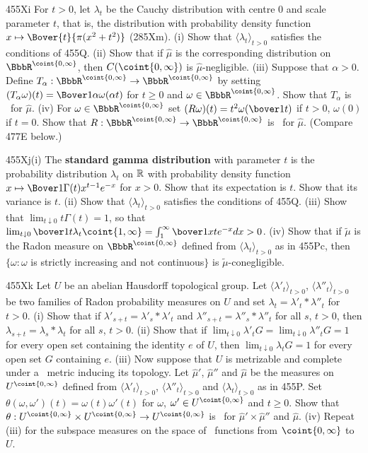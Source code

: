{\sqheader 455Xi For $t>0$, let $\lambda_t$ be the Cauchy
distribution with centre $0$ and scale parameter $t$, that is, the
distribution with probability density function
$x\mapsto\Bover{t}{\pi(x^2+t^2)}$ (285Xm).
(i) Show that $\langle\lambda_t\rangle_{t>0}$ satisfies the conditions of
455Q.   (ii) Show that if $\hat\mu$ is the corresponding distribution on
$\BbbR^{\coint{0,\infty}}$, then $C(\coint{0,\infty})$ is
$\hat\mu$-negligible.
(iii) Suppose that $\alpha>0$.   Define
$T_{\alpha}:\BbbR^{\coint{0,\infty}}\to\BbbR^{\coint{0,\infty}}$ by setting
$(T_{\alpha}\omega)(t)=\Bover1{\alpha}\omega(\alpha t)$ for $t\ge 0$ and
$\omega\in\BbbR^{\coint{0,\infty}}$.   Show that $T_{\alpha}$ is \imp\ for
$\hat\mu$.   (iv) For $\omega\in\BbbR^{\coint{0,\infty}}$ set
$(R\omega)(t)=t^2\omega(\bover1t)$ if $t>0$, $\omega(0)$ if $t=0$.
Show that $R:\BbbR^{\coint{0,\infty}}\to\BbbR^{\coint{0,\infty}}$ is \imp\
for $\hat\mu$.   (Compare 477E below.)

\sqheader 455Xj(i) The {\bf standard gamma distribution} with
parameter $t$ is the probability distribution $\lambda_t$ on
$\Bbb R$ with probability density function
$x\mapsto\Bover1{\Gamma(t)}x^{t-1}e^{-x}$ for $x>0$.   Show
that its expectation is $t$.     Show that its
variance is $t$.
(ii) Show that $\langle\lambda_t\rangle_{t>0}$ satisfies the conditions of
455Q.    \Hint{272U\formerly{2{}72T}, 252Yf.}   (iii) Show that
$\lim_{t\downarrow 0}t\Gamma(t)=1$, so that
$\lim_{t\downarrow 0}\bover1t\lambda_t\coint{1,\infty}
=\int_1^{\infty}\bover1xte^{-x}dx>0$.
(iv) Show that if $\tilde\mu$ is the Radon measure on
$\BbbR^{\coint{0,\infty}}$ defined from $\langle\lambda_t\rangle_{t>0}$ as
in 455Pc, then $\{\omega:\omega$ is strictly increasing and not
continuous$\}$ is $\tilde\mu$-conegligible.

\spheader 455Xk Let $U$ be an abelian Hausdorff topological group.   Let
$\langle\lambda'_t\rangle_{t>0}$, $\langle\lambda''_t\rangle_{t>0}$ be two
families of Radon probability measures on $U$ and set
$\lambda_t=\lambda'_t*\lambda''_t$ for $t>0$.   (i) Show that if
$\lambda'_{s+t}=\lambda'_s*\lambda'_t$ and
$\lambda''_{s+t}=\lambda''_s*\lambda''_t$ for all $s$, $t>0$, then
$\lambda_{s+t}=\lambda_s*\lambda_t$ for all $s$, $t>0$.   (ii) Show that if
$\lim_{t\downarrow 0}\lambda'_tG=\lim_{t\downarrow 0}\lambda''_tG=1$ for
every open set containing the identity $e$ of $U$, then
$\lim_{t\downarrow 0}\lambda_tG=1$ for every open set $G$ containing $e$.
(iii) Now suppose that $U$ is metrizable and complete under a \rti\ metric
inducing its topology.   Let $\hat\mu'$, $\hat\mu''$ and $\hat\mu$ be the
measures on $U^{\coint{0,\infty}}$ defined from
$\langle\lambda'_t\rangle_{t>0}$, $\langle\lambda''_t\rangle_{t>0}$ and
$\langle\lambda_t\rangle_{t>0}$ as in 455P.   Set
$\theta(\omega,\omega')(t)=\omega(t)\omega'(t)$ for $\omega$,
$\omega'\in U^{\coint{0,\infty}}$ and $t\ge 0$.   Show that $\theta:
U^{\coint{0,\infty}}\times U^{\coint{0,\infty}}\to U^{\coint{0,\infty}}$ 
is \imp\ for $\hat\mu'\times\hat\mu''$ and $\hat\mu$.
(iv) Repeat (iii) for the subspace measures on the space of
\cadlag\ functions from $\coint{0,\infty}$ to $U$.

}
